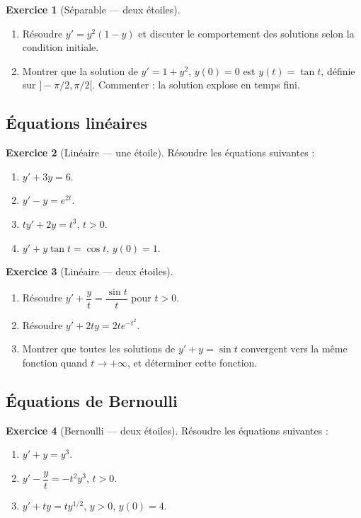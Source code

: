 \documentclass[12pt,a4paper,openany]{book}
\theoremstyle{definition}
\newtheorem{exercice}{Exercice}[chapter]
\theoremstyle{plain}
\theoremstyle{remark}
\begin{document}
\begin{exercice}[Séparable --- deux étoiles]
\label{exo:ch2-sep-2}
\begin{enumerate}[label=(\alph*)]
\item Résoudre $y' = y^2(1-y)$ et discuter le comportement des solutions selon la condition initiale.
\item Montrer que la solution de $y' = 1 + y^2$, $y(0) = 0$ est $y(t) = \tan t$, définie sur $]-\pi/2, \pi/2[$. Commenter : la solution explose en temps fini.
\end{enumerate}
\end{exercice}

\subsection*{Équations linéaires}

\begin{exercice}[Linéaire --- une étoile]
\label{exo:ch2-lin-1}
Résoudre les équations suivantes :
\begin{enumerate}[label=(\alph*)]
\item $y' + 3y = 6$.
\item $y' - y = e^{2t}$.
\item $ty' + 2y = t^3$, $t > 0$.
\item $y' + y\tan t = \cos t$, $y(0) = 1$.
\end{enumerate}
\end{exercice}

\begin{exercice}[Linéaire --- deux étoiles]
\label{exo:ch2-lin-2}
\begin{enumerate}[label=(\alph*)]
\item Résoudre $y' + \dfrac{y}{t} = \dfrac{\sin t}{t}$ pour $t > 0$.
\item Résoudre $y' + 2ty = 2te^{-t^2}$.
\item Montrer que toutes les solutions de $y' + y = \sin t$ convergent vers la même fonction quand $t \to +\infty$, et déterminer cette fonction.
\end{enumerate}
\end{exercice}

\subsection*{Équations de Bernoulli}

\begin{exercice}[Bernoulli --- deux étoiles]
\label{exo:ch2-bern}
Résoudre les équations suivantes :
\begin{enumerate}[label=(\alph*)]
\item $y' + y = y^3$.
\item $y' - \dfrac{y}{t} = -t^2 y^3$, $t > 0$.
\item $y' + ty = ty^{1/2}$, $y > 0$, $y(0) = 4$.
\end{enumerate}
\end{exercice}
\end{document}
